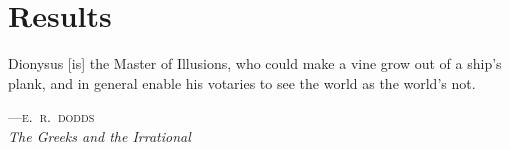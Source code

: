 %
%

\chapter{Results}
\epigraph{Dionysus [is] the Master of Illusions, who could make a vine 
grow out of a ship's plank, and in general enable his votaries to see 
the world as the world's not.}%
{\textsc{---e.\ r.\ dodds}\\\textit{The Greeks and the Irrational}}

